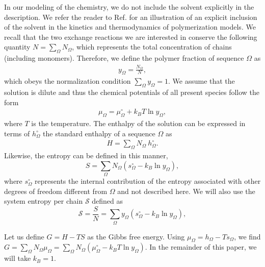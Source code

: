 \documentclass[
	amsmath,
	amssymb,
	a4paper,
	aip,		%
	jcp,		%
	reprint, twocolumn  %
	fleqn,
	showpacs,
	floatfix
]{revtex4-1}
\newcommand{\be}{\begin{equation}}
\newcommand{\ee}{\end{equation}}
\begin{document}
In our modeling of the chemistry, we do not include the solvent explicitly in the description. 
We refer the reader to Ref. \citep{Lahiri2015} for an illustration of an explicit inclusion of the solvent in the kinetics and thermodynamics of polymerization models. 
We recall that the two exchange reactions we are interested in conserve the following quantity $N=\sum_{\Omega} N_{\Omega}$, 
which represents the total concentration of chains (including monomers).
Therefore, we define the polymer fraction of sequence $\Omega$ as
\begin{equation}
\begin{split}
y_{\Omega}=\frac{N_\Omega}{N}, 
\end{split}
\label{yl}
\end{equation}
which obeys the normalization condition $\sum_{\Omega} y_{\Omega} = 1$. We assume that the solution is dilute and
thus the chemical potentials of all present species follow the form
\begin{equation}
	\begin{split}
\mu_{\Omega}=\mu^{\circ}_{\Omega} + k_B T \ln y_{\Omega},
\end{split}
\label{mu}
\end{equation}
where $T$ is the temperature. The enthalpy of the solution can be expressed in terms of $h^{\circ}_{\Omega}$ the standard enthalpy of a 
sequence $\Omega$ as
\begin{equation}
\begin{split}
H= \sum _{\Omega} N_{\Omega} \ h^{\circ}_{\Omega}. 
\end{split}
\label{H}
\end{equation}
Likewise, the entropy can be defined in this manner, 
\begin{equation}
S= \sum _{\Omega} N_{\Omega} (s^{\circ}_{\Omega} - k_B  \ln y_{\Omega}),
\label{S}
\end{equation}
where $s^{\circ}_{\Omega}$ represents the internal contribution of the entropy associated with other degrees of freedom 
different from $\Omega$ and not described here.
We will also use the system entropy per chain $\mathcal{S}$ defined as
\be
\mathcal{S}=\frac{S}{N}=\sum _{\Omega} y_{\Omega} (s^{\circ}_{\Omega} - k_B  \ln y_{\Omega}),
\label{Sdef}
\ee


Let us define $G=H-TS$ as the Gibbs free energy. Using $\mu_{\Omega}=h_{\Omega}-T s_{\Omega}$, 
we find 
$G= \sum _{\Omega} N_{\Omega} \mu_{\Omega}=  \sum _{\Omega} N_{\Omega} (\mu^{\circ}_{\Omega} - k_B T  \ln y_{\Omega})$.
In the remainder of this paper, we will 
take $k_B=1$.
\end{document}
